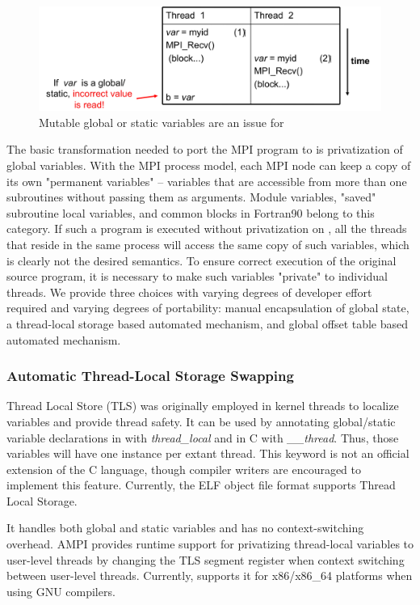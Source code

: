\documentclass[10pt]{article}
\begin{document}
\begin{figure}[h]
\centering
\includegraphics[width=4.6in]{figs/global.png}
\caption{Mutable global or static variables are an issue for \ampi{}}
\label{fig_global}
\end{figure}

The basic transformation needed to port the MPI program to \ampi{} is
privatization of global variables.
With the MPI process model, each MPI node can keep a copy of its own
"permanent variables" -- variables that are accessible from more than one
subroutines without passing them as arguments.  Module variables, "saved"
subroutine local variables, and common blocks in Fortran90 belong to this
category. If such a program is executed without privatization on \ampi{}, all
the \ampi{} threads that reside in the same process will access the same copy of
such variables, which is clearly not the desired semantics.  To ensure correct
execution of the original source program, it is necessary to make such
variables "private" to individual threads. We provide three choices with varying
degrees of developer effort required and varying degrees of portability:
manual encapsulation of global state, a thread-local storage based automated mechanism, and
global offset table based automated mechanism.

\subsubsection{Automatic Thread-Local Storage Swapping}
Thread Local Store (TLS) was originally employed in kernel threads to
localize variables and provide thread safety. It can be used by annotating
global/static variable declarations in \CC{} with \emph{thread\_local}
and in C with \emph{\_\_thread}. Thus, those variables will have one instance
per extant thread. This keyword is not an official extension of the C language,
though compiler writers are encouraged to implement this feature. Currently,
the ELF object file format supports Thread Local Storage.

It handles both global and static variables and has no context-switching
overhead. AMPI provides runtime support for privatizing thread-local variables to user-level threads
by changing the TLS segment register when context switching between user-level threads.
Currently, \charmpp{} supports it for x86/x86\_64 platforms when using GNU compilers.
\end{document}
